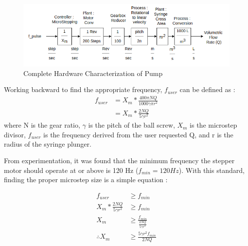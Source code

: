 \documentclass[journal]{IEEEtran}
\begin{document}
                \begin{figure}[H]
                    \centering
                    \includegraphics[scale = 0.35]{total_hardware}
                    \caption{Complete Hardware Characterization of Pump}
                    \label{fig:total_hard}
                \end{figure}
                
                Working backward to find the appropriate frequency, \(f_{user}\) can be defined as : 
                \begin{equation}
                    \begin{split}
                        f_{user} &= X_m * \frac{400\pi N Q}{1000\gamma \pi r^2 }\\
                         &= X_m * \frac{2 N Q}{5\gamma r^2 }
                     \end{split}
                \end{equation}
                where N is the gear ratio, \(\gamma\) is the pitch of the ball screw, \(X_m\) is the microstep divisor, \(f_{user}\) is the frequency derived from the user requested Q, and r is the radius of the syringe plunger.
                
                From experimentation, it was found that the minimum frequency the stepper motor should operate at or above is 120 Hz (\(f_{min} = 120Hz\)). With this standard, finding the proper microstep size is a simple equation : 
                
                \begin{equation}
                    \begin{split}
                        f_{user} &\geq f_{min}\\ 
                        X_m * \frac{2 N Q}{5\gamma r^2 } &\geq f_{min}\\
                        X_m &\geq \frac{f_{min}}{\frac{2 N Q}{5\gamma r^2 }}\\
                        \therefore X_m &\geq \frac{5 \gamma r^2 f_{min}}{2NQ}
                    \end{split}
                \end{equation}
                
\end{document}
